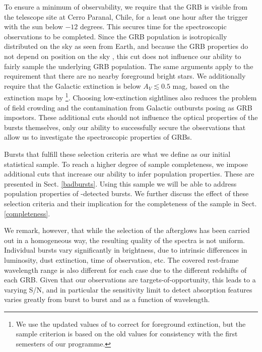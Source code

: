 \documentclass[longauth]{aa}    %
\begin{document}
To ensure a minimum of observability, we require that the GRB is visible from
the telescope site at Cerro Paranal, Chile, for a least one hour after the trigger
with the sun below $-12$ degrees. This secures time for the spectroscopic
observations to be completed. Since the GRB population is isotropically
distributed on the sky as seen from Earth, and because the GRB properties do not
depend on position on the sky \citep{Meegan1992, Briggs1996, Ukwatta2016}, this
cut does not influence our ability to fairly sample the underlying GRB
population. The same arguments apply to the requirement that there are no nearby
foreground bright stars. We additionally require that the Galactic extinction is
below $A_V \lesssim 0.5$ mag, based on the extinction maps by
\citet{Schlegel1998}\footnote{We use the updated values of \citet{Schlafly2011}
	to correct for foreground extinction, but the sample criterion is based on the
	old \citet{Schlegel1998} values for consistency with the first semesters of our
	programme.}. Choosing low-extinction sightlines also reduces the problem of field
crowding and the contamination from Galactic outbursts posing as GRB impostors.
These additional cuts should not influence the optical properties of the bursts
themselves, only our ability to successfully secure the observations that allow
us to investigate the spectroscopic properties of GRBs.

Bursts that fulfill these selection criteria are what we define as our initial
statistical sample. To reach a higher degree of sample completeness, we
impose additional cuts that increase our ability to infer population properties.
These are presented in Sect. \ref{badbursts}. Using this sample we will be able
to address population properties of \swift-detected bursts. We further discuss
the effect of these selection criteria and their implication for the
completeness of the sample in Sect. \ref{completeness}.

We remark, however, that while the selection of the afterglows has been carried
out in a homogeneous way, the resulting quality of the spectra is not uniform.
Individual bursts vary significantly in brightness, due to intrinsic differences
in luminosity, dust extinction, time of observation, etc. The covered rest-frame
wavelength range is also different for each case due to the different redshifts
of each GRB. Given that our observations are targets-of-opportunity, this leads
to a varying S/N, and in particular the sensitivity limit to detect absorption
features varies greatly from burst to burst and as a function of wavelength.
\end{document}
